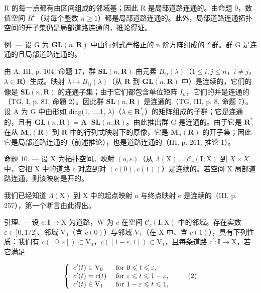 R 的每一点都有由区间组成的邻域基；因此 R 是局部道路连通的。由命题 9，数值空间 \(R^{n}\)（对每个整数 \(n \geqslant 1\)）都是局部道路连通的。此外，局部道路连通拓扑空间的开子集仍是局部道路连通的，推论得证。

例. --- 设 G 为 \(\mathbf{GL}(n,\mathbf{R})\) 中由行列式严格正的 n 阶方阵组成的子群。群 G 是连通的且局部道路连通的。

由 A, III, p. 104, 命题 17，群 \(\mathbf{SL}(n,\mathbf{R})\) 由元素 \(B_{ij}(\lambda)\)（\(1\leqslant i,j\leqslant n\)，\(i\neq j\)，\(\lambda\in\mathbf{R}\)）生成。映射 \(\lambda\mapsto B_{ij}(\lambda)\)（从 \(\mathbf{R}\) 到 \(\mathbf{GL}(n,\mathbf{R})\) 中）是连续的，它们的像是 \(\mathbf{SL}(n,\mathbf{R})\) 的连通子集；由于它们都包含单位矩阵 \(I_n\)，它们的并是连通的（TG, I, p. 81, 命题 2）。因此群 \(\mathbf{SL}(n,\mathbf{R})\) 是连通的（TG, III, p. 8, 命题 7）。设 A 为 G 中由形如 diag(1, \(\ldots\),1, \(\lambda\))（\(\lambda\in\mathbf{R}_{+}^{*}\)）的矩阵组成的子群；它是连通的，且有 \(\mathbf{GL}(n,\mathbf{R})=\mathbf{A}\cdot\mathbf{SL}(n,\mathbf{R})\)。由此推出群 G 是连通的。由于它是 \(\mathbf{R}_{+}^{*}\) 在从 \(\mathbf{M}_{n}(\mathbf{R})\) 到 \(\mathbf{R}\) 中的行列式映射下的原像，它是 \(\mathbf{M}_{n}(\mathbf{R})\) 的开子集；因此它是局部道路连通的（前述推论），也是道路连通的（III, p. 261, 推论 1）。

命题 10. --- 设 X 为拓扑空间。映射 \((o, e)\)（从 \(\Lambda(\mathrm{X}) = \mathcal{C}_{c}(\mathbf{I}; \mathrm{X})\) 到 \(X \times X\) 中，它把 X 中的道路 c 对应到对 \((c(0), c(1))\)）是连续的。若空间 X 局部道路连通，则该映射是开的。

我们已经知道 \(\Lambda(\mathrm{X})\) 到 X 中的起点映射 o 与终点映射 e 是连续的（III, p. 257），第一个断言由此得出。

引理. --- 设 \(c\colon \mathbf{I}\to \mathrm{X}\) 为道路，W 为 \(c\) 在空间 \(\mathcal{C}_c(\mathbf{I};\mathrm{X})\) 中的邻域。存在实数 \(\varepsilon \in ]0,1 / 2]\)、邻域 \(\mathrm{V}_0\)（含 \(c(0)\)）与邻域 \(\mathrm{V}_1\)（在 X 中、含 \(c(1)\)），具有下列性质：我们有 \(c([0,\varepsilon])\subset \mathrm{V}_0\)，\(c([1 - \varepsilon,1])\subset \mathrm{V}_1\)，且每条道路 \(c^{\prime}\colon \mathbf{I}\rightarrow \mathrm{X}\)，若它满足

\[
\left\{ \begin{array}{l l} c ^ {\prime} (t) \in \mathrm{V} _ {0} & \text { for } 0 \leqslant t \leqslant \varepsilon , \\ c ^ {\prime} (t) = c (t) & \text { for } \varepsilon \leqslant t \leqslant 1 - \varepsilon , \\ c ^ {\prime} (t) \in \mathrm{V} _ {1} & \text { for } 1 - \varepsilon \leqslant t \leqslant 1, \end{array} \right.\tag{2}
\]

